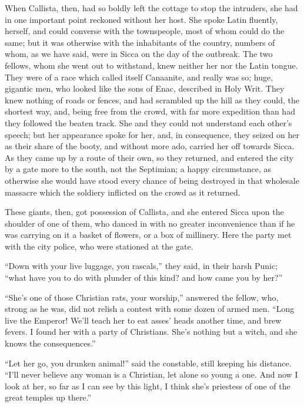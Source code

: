 When Callista, then, had so boldly left the cottage to stop the
intruders, she had in one important point reckoned without her host.
She spoke Latin fluently, herself, and could converse with the
townspeople, most of whom could do the same; but it was otherwise with
the inhabitants of the country, numbers of whom, as we have said, were
in Sicca on the day of the outbreak. The two fellows, whom she went
out to withstand, knew neither her nor the Latin tongue. They were of
a race which called itself Canaanite, and really was so; huge,
gigantic men, who looked like the sons of Enac, described in Holy
Writ. They knew nothing of roads or fences, and had scrambled up the
hill as they could, the shortest way, and, being free from the
crowd, with far more expedition than had they followed the beaten
track. She and they could not understand each other's speech; but her
appearance spoke for her, and, in consequence, they seized on her as
their share of the booty, and without more ado, carried her off
towards Sicca. As they came up by a route of their own, so they
returned, and entered the city by a gate more to the south, not the
Septimian; a happy circumstance, as otherwise she would have stood
every chance of being destroyed in that wholesale massacre which the
soldiery inflicted on the crowd as it returned.

These giants, then, got possession of Callista, and she entered
Sicca upon the shoulder of one of them, who danced in with no greater
inconvenience than if he was carrying on it a basket of flowers, or a
box of millinery. Here the party met with the city police, who were
stationed at the gate.

``Down with your live luggage, you rascals,'' they said, in
their harsh Punic; ``what have you to do with plunder of this
kind? and how came you by her?''

``She's one of those Christian rats, your worship,''
answered the fellow, who, strong as he was, did not relish a contest
with some dozen of armed men. ``Long live the Emperor! We'll teach
her to eat asses' heads another time, and brew fevers. I found her
with a party of Christians. She's nothing but a witch, and she knows
the consequences.''

``Let her go, you drunken animal!'' said the constable,
still keeping his distance. ``I'll never believe any woman
is a Christian, let alone so young a one. And now I look at her, so
far as I can see by this light, I think she's priestess of one of the
great temples up there.''

